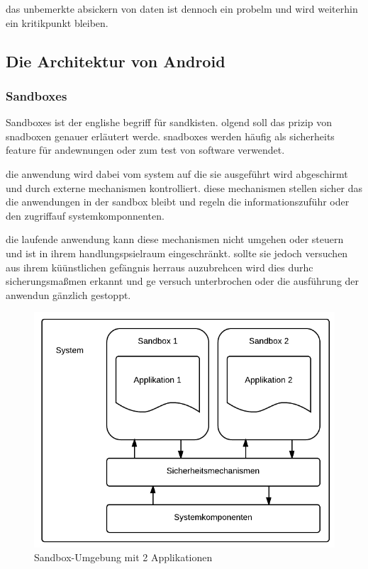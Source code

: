 das unbemerkte absickern von daten ist dennoch ein probelm und wird weiterhin ein kritikpunkt bleiben.


\subsection{Die Architektur von Android}
\subsubsection{Sandboxes}
\label{sandbox}
Sandboxes ist der englishe begriff für sandkisten. olgend soll das prizip von snadboxen genauer erläutert werde. snadboxes werden häufig als sicherheits feature für andewnungen oder zum test von software verwendet.

die anwendung wird dabei vom  system auf die sie ausgeführt wird abgeschirmt und durch externe mechanismen kontrolliert. diese mechanismen stellen sicher das die anwendungen in der sandbox bleibt und regeln die informationszuführ oder den zugriffauf systemkomponnenten.

die laufende anwendung kann diese mechanismen nicht umgehen oder steuern und ist in ihrem handlungspsielraum eingeschränkt. sollte sie jedoch versuchen aus ihrem küünstlichen gefängnis herraus auzubrehcen wird dies durhc sicherungsmaßmen erkannt und ge versuch unterbrochen oder die ausführung der anwendun gänzlich gestoppt.

\begin{figure}
\begin{center}
\includegraphics[scale=0.6]{images/sandbox}
\caption{Sandbox-Umgebung mit 2 Applikationen}
\label{sandbox}
\end{center}
\end{figure}

